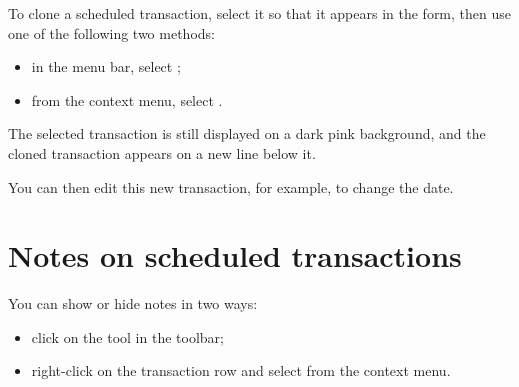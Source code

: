 To clone a scheduled transaction, select it so that it appears in the form, then use one of the following two methods:
\begin{itemize}
	\item in the menu bar, select ;
	\item from the context menu, select .
\end{itemize}

The selected transaction is still displayed on a \colorbox[RGB]{245,155,155}{dark pink background}, and the cloned transaction appears on a new line below it.

You can then edit this new transaction, for example, to change the date.


\section{Notes on scheduled transactions\label{plannedtransactions-comments}}

You can show or hide notes in two ways:
\begin{itemize}
	\item click on the  tool in the toolbar;
	\item right-click on the transaction row and select  from the context menu.
\end{itemize}

